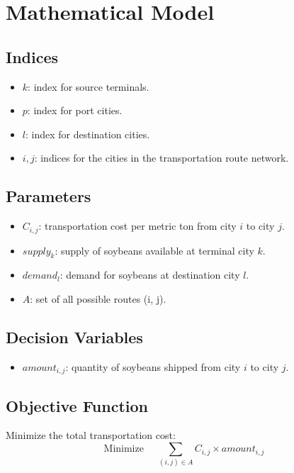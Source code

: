\documentclass{article}
\begin{document}
\section*{Mathematical Model}

\subsection*{Indices}
\begin{itemize}
    \item \( k \): index for source terminals.
    \item \( p \): index for port cities.
    \item \( l \): index for destination cities.
    \item \( i, j \): indices for the cities in the transportation route network.
\end{itemize}

\subsection*{Parameters}
\begin{itemize}
    \item \( C_{i,j} \): transportation cost per metric ton from city \( i \) to city \( j \).
    \item \( supply_{k} \): supply of soybeans available at terminal city \( k \).
    \item \( demand_{l} \): demand for soybeans at destination city \( l \).
    \item \( A \): set of all possible routes (i, j).
\end{itemize}

\subsection*{Decision Variables}
\begin{itemize}
    \item \( amount_{i,j} \): quantity of soybeans shipped from city \( i \) to city \( j \).
\end{itemize}

\subsection*{Objective Function}
Minimize the total transportation cost:
\[
\text{Minimize } \quad \sum_{(i,j) \in A} C_{i,j} \times amount_{i,j}
\]
\end{document}
